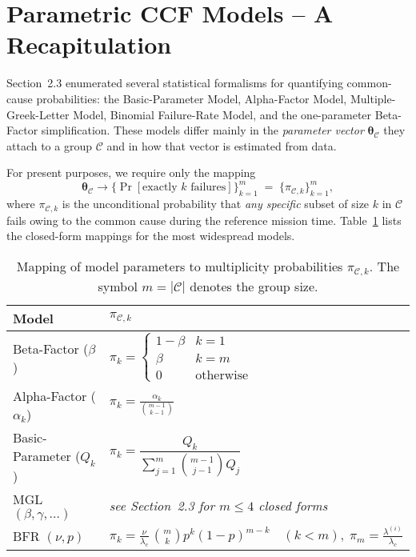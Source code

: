 \section{Parametric CCF Models – A Recapitulation}
\label{sec:ccf_models_recap}

Section~2.3 enumerated several statistical formalisms for quantifying common-
cause probabilities: the Basic-Parameter Model, Alpha-Factor Model, Multiple-
Greek-Letter Model, Binomial Failure-Rate Model, and the one-parameter
Beta-Factor simplification.  These models differ mainly in the \emph{parameter
vector}
\(\boldsymbol{\theta}_{\!\mathcal{C}}\) they attach to a group
\(\mathcal{C}\) and in how that vector is estimated from data.

For present purposes, we require only the mapping
\[\boldsymbol{\theta}_{\!\mathcal{C} } \longrightarrow
  \bigl\{\Pr[\text{exactly }k\text{ failures}]\bigr\}_{k=1}^{m}
  \;=\; \{\pi_{\mathcal{C},k}\}_{k=1}^{m} ,\]
where \(\pi_{\mathcal{C},k}\) is the unconditional probability that \emph{any
specific} subset of size \(k\) in \(\mathcal{C}\) fails owing to the common
cause during the reference mission time.  Table~\ref{tab:ccf_model_mapping}
lists the closed-form mappings for the most widespread models.

\begin{table}[t]
  \centering
  \caption{Mapping of model parameters to multiplicity probabilities
           \(\pi_{\mathcal{C},k}\).  The symbol \(m=|\mathcal{C}|\) denotes
           the group size.}
  \label{tab:ccf_model_mapping}
  \begin{tabular}{l@{\qquad}l}
    \toprule
    Model & $\pi_{\mathcal{C},k}$\\
    \midrule
    Beta-Factor ($\beta$) & $\pi_{k}=\begin{cases}
        1-\beta & k=1\\[4pt]
        \beta & k=m\\[2pt]
        0 & \text{otherwise}
      \end{cases}$\\[8pt]
    Alpha-Factor ($\alpha_k$) & $\displaystyle
      \pi_{k}=\frac{\alpha_k}{\binom{m-1}{k-1}}$\\[10pt]
    Basic-Parameter ($Q_k$) & $\pi_{k}=\dfrac{Q_k}{\sum_{j=1}^{m} \binom{m-1}{j-1}Q_j}$\\[10pt]
    MGL $(\beta,\gamma,\dots)$ & \emph{see Section~2.3 for $m\le 4$ closed forms}\\[8pt]
    BFR $(\nu,p)$ & $\displaystyle
      \pi_{k}= \frac{\nu}{\lambda_{c}}\, \binom{m}{k} p^{k}(1-p)^{m-k}
      \quad (k<m), \; \pi_{m}=\frac{\lambda^{(i)}}{\lambda_{c}}$\\
    \bottomrule
  \end{tabular}
\end{table}

